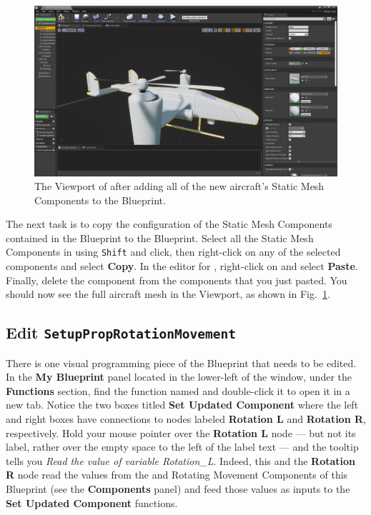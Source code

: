 \begin{figure}[t]
    \centering
    \includegraphics[width=\textwidth]{figures/ue4_blueprint_viewport}
    \caption[Viewport of Blueprint with example aircraft mesh]{
        The Viewport of  after adding all of the new aircraft's Static Mesh Components to the Blueprint.}%
    \label{fig:ue4_blueprint_viewport}
\end{figure}

The next task is to copy the configuration of the Static Mesh Components contained in the  Blueprint to the  Blueprint. Select all the Static Mesh Components in  using \texttt{Shift} and click, then right-click on any of the selected components and select \textbf{Copy}. In the editor for , right-click on  and select \textbf{Paste}. Finally, delete the  component from the components that you just pasted. You should now see the full aircraft mesh in the  Viewport, as shown in Fig.~\ref{fig:ue4_blueprint_viewport}.

\subsection{Edit \texttt{SetupPropRotationMovement}}\label{sec:ue4_blueprint_setupprop}

There is one visual programming piece of the Blueprint that needs to be edited. In the \textbf{My Blueprint} panel located in the lower-left of the window, under the \textbf{Functions} section, find the function named  and double-click it to open it in a new tab. Notice the two boxes titled \textbf{Set Updated Component} where the left and right boxes have connections to nodes labeled \textbf{Rotation L} and \textbf{Rotation R}, respectively. Hold your mouse pointer over the \textbf{Rotation L} node --- but not its label, rather over the empty space to the left of the label text --- and the tooltip tells you \textit{Read the value of variable Rotation\_L}. Indeed, this and the \textbf{Rotation R} node read the values from the  and  Rotating Movement Components of this Blueprint (see the \textbf{Components} panel) and feed those values as inputs to the \textbf{Set Updated Component} functions.

